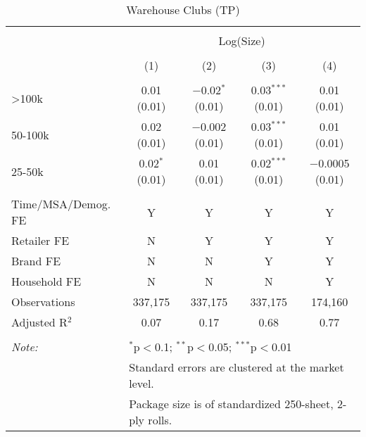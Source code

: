 
\begin{table}[!htbp] \centering 
  \caption{Warehouse Clubs (TP)} 
  \label{tab:packageSizeWarehouse} 
\begin{tabular}{@{\extracolsep{5pt}}lcccc} 
\\[-1.8ex]\hline 
\hline \\[-1.8ex] 
 & \multicolumn{4}{c}{Log(Size)} \\ 
\\[-1.8ex] & (1) & (2) & (3) & (4)\\ 
\hline \\[-1.8ex] 
 >100k & 0.01 (0.01) & $-$0.02$^{*}$ (0.01) & 0.03$^{***}$ (0.01) & 0.01 (0.01) \\ 
  50-100k & 0.02 (0.01) & $-$0.002 (0.01) & 0.03$^{***}$ (0.01) & 0.01 (0.01) \\ 
  25-50k & 0.02$^{*}$ (0.01) & 0.01 (0.01) & 0.02$^{***}$ (0.01) & $-$0.0005 (0.01) \\ 
 \hline \\[-1.8ex] 
Time/MSA/Demog. FE & Y & Y & Y & Y \\ 
Retailer FE & N & Y & Y & Y \\ 
Brand FE & N & N & Y & Y \\ 
Household FE & N & N & N & Y \\ 
Observations & 337,175 & 337,175 & 337,175 & 174,160 \\ 
Adjusted R$^{2}$ & 0.07 & 0.17 & 0.68 & 0.77 \\ 
\hline 
\hline \\[-1.8ex] 
\textit{Note:}  & \multicolumn{4}{l}{$^{*}$p$<$0.1; $^{**}$p$<$0.05; $^{***}$p$<$0.01} \\ 
 & \multicolumn{4}{l}{Standard errors are clustered at the market level.} \\ 
 & \multicolumn{4}{l}{Package size is of standardized 250-sheet, 2-ply rolls.} \\ 
\end{tabular} 
\end{table} 
